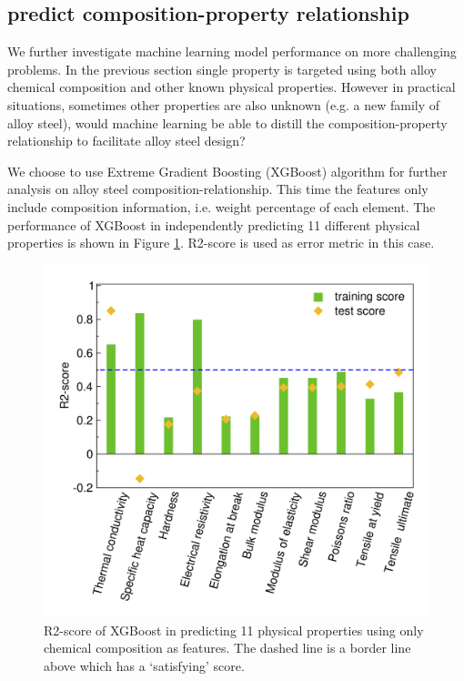 \documentclass[10pt,aps,prb,amsmath,amssymb,twocolumn,letterpaper,nobalancelastpage,final,citeautoscript,floatfix,raggedbottom,superscriptaddress]{revtex4-1}
\begin{document}
\subsection{predict composition-property relationship}

We further investigate machine learning model performance on more challenging problems. In the previous section single property is targeted using both alloy chemical composition and other known physical properties. However in practical situations, sometimes other properties are also unknown (e.g. a new family of alloy steel), would machine learning be able to distill the composition-property relationship to facilitate alloy steel design?

We choose to use Extreme Gradient Boosting (XGBoost) algorithm for further analysis on alloy steel composition-relationship. This time the features only include composition information, i.e. weight percentage of each element. The performance of XGBoost in independently predicting 11 different physical properties is shown in Figure \ref{fig:compo-prop}. R2-score is used as error metric in this case.

\begin{figure}[h]
  \center
  \vspace{-1mm}
 \includegraphics[width=0.95\linewidth]{figures/compo-prop.png}
  \caption{R2-score of XGBoost in predicting 11 physical properties using only chemical composition as features. The dashed line is a border line above which has a `satisfying' score. }
  \label{fig:compo-prop}
\end{figure}
\end{document}
